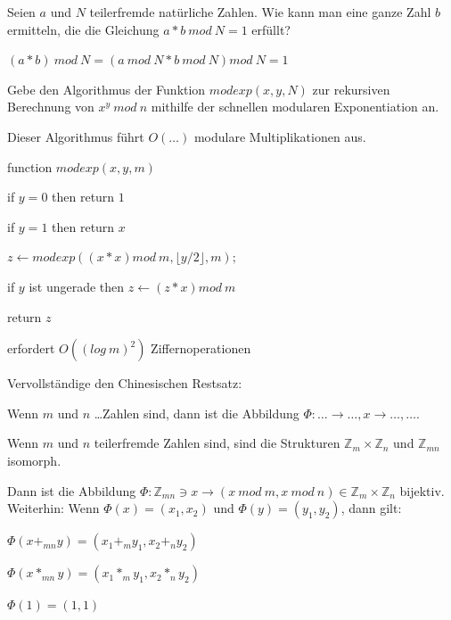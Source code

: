 \documentclass[avery5371, frame]{flashcards}
\begin{document}
\begin{flashcard}[Zahlentheorie]{Seien $a$ und $N$ teilerfremde natürliche Zahlen. Wie kann man eine ganze Zahl $b$ ermitteln, die die Gleichung $a*b\ mod\ N= 1$ erfüllt?}

    $(a*b)\ mod\ N = (a\ mod\ N * b\ mod\ N)mod\ N = 1$
\end{flashcard}

\begin{flashcard}[Zahlentheorie]{Gebe den Algorithmus der Funktion $modexp(x,y,N)$ zur rekursiven Berechnung von $x^y\ mod\ n$ mithilfe der schnellen modularen Exponentiation an.

        Dieser Algorithmus führt $O(\dots)$ modulare Multiplikationen aus.}

    function $modexp(x,y,m)$
    \begin{itemize*}
        \item[] if $y= 0$ then return $1$
        \item[] if $y= 1$ then return $x$
        \item[] $z\leftarrow modexp((x*x) mod\ m,\lfloor y/2\rfloor,m);$ %
        \item[] if $y$ ist ungerade then $z\leftarrow (z*x) mod\ m$
        \item[] return $z$
    \end{itemize*}

    erfordert $O((log\ m)^2)$ Ziffernoperationen
\end{flashcard}

\begin{flashcard}[Zahlentheorie]{Vervollständige den Chinesischen Restsatz:

        Wenn $m$ und $n$ \dots Zahlen sind, dann ist die Abbildung $\Phi:\dots\rightarrow\dots, x\rightarrow \dots,\dots$.}
    Wenn $m$ und $n$ teilerfremde Zahlen sind, sind die Strukturen $\mathbb{Z}_m \times\mathbb{Z}_n$ und $\mathbb{Z}_{mn}$ isomorph.

    Dann ist die Abbildung $\Phi:\mathbb{Z}_{mn} \owns x \rightarrow (x\ mod\ m, x\ mod\ n)\in\mathbb{Z}_m\times\mathbb{Z}_n$ bijektiv. Weiterhin: Wenn $\Phi(x)=(x_1,x_2)$ und $\Phi(y)=(y_1,y_2)$, dann gilt:
    \begin{itemize*}
        \item $\Phi(x+_{mn} y) = (x_1 +_m y_1 , x_2 +_n y_2)$
        \item $\Phi(x*_{mn} y) = (x_1 *_m y_1 , x_2 *_n y_2)$
        \item $\Phi(1) = (1,1)$
    \end{itemize*}
\end{flashcard}
\end{document}

